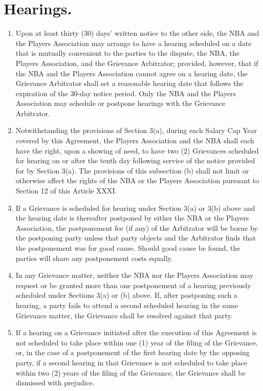 \documentclass[
]{book}
\providecommand{\tightlist}{%
  \setlength{\itemsep}{0pt}\setlength{\parskip}{0pt}}
\begin{document}
\hypertarget{hearings.}{%
\section{Hearings.}\label{hearings.}}

\begin{enumerate}
\def\labelenumi{(\alph{enumi})}
\tightlist
\item
  Upon at least thirty (30) days' written notice to the other side, the NBA and the Players Association may arrange to have a hearing scheduled on a date that is mutually convenient to the parties to the dispute, the NBA, the Players Association, and the Grievance Arbitrator; provided, however, that if the NBA and the Players Association cannot agree on a hearing date, the Grievance Arbitrator shall set a reasonable hearing date that follows the expiration of the 30-day notice period. Only the NBA and the Players Association may schedule or postpone hearings with the Grievance Arbitrator.
\item
  Notwithstanding the provisions of Section 3(a), during each Salary Cap Year covered by this Agreement, the Players Association and the NBA shall each have the right, upon a showing of need, to have two (2) Grievances scheduled for hearing on or after the tenth day following service of the notice provided for by Section 3(a). The provisions of this subsection (b) shall not limit or otherwise affect the rights of the NBA or the Players Association pursuant to Section 12 of this Article XXXI.
\item
  If a Grievance is scheduled for hearing under Section 3(a) or 3(b) above and the hearing date is thereafter postponed by either the NBA or the Players Association, the postponement fee (if any) of the Arbitrator will be borne by the postponing party unless that party objects and the Arbitrator finds that the postponement was for good cause. Should good cause be found, the parties will share any postponement costs equally.
\item
  In any Grievance matter, neither the NBA nor the Players Association may request or be granted more than one postponement of a hearing previously scheduled under Sections 3(a) or (b) above. If, after postponing such a hearing, a party fails to attend a second scheduled hearing in the same Grievance matter, the Grievance shall be resolved against that party.
\item
  If a hearing on a Grievance initiated after the execution of this Agreement is not scheduled to take place within one (1) year of the filing of the Grievance, or, in the case of a postponement of the first hearing date by the opposing party, if a second hearing in that Grievance is not scheduled to take place within two (2) years of the filing of the Grievance, the Grievance shall be dismissed with prejudice.

\end{enumerate}
\end{document}
